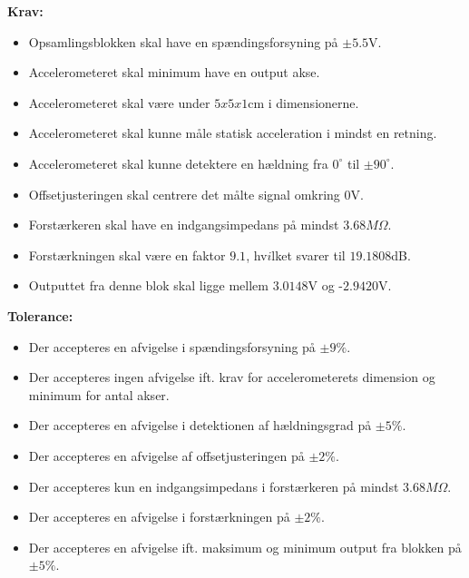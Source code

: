 \noindent\textbf{Krav:}
\begin{itemize}
	\item Opsamlingsblokken skal have en spændingsforsyning på $\pm5.5$V.
	\item Accelerometeret skal minimum have en output akse.%
	\item Accelerometeret skal være under $5x5x1$cm i dimensionerne.%
	\item Accelerometeret skal kunne måle statisk acceleration i mindst en retning.
	\item Accelerometeret skal kunne detektere en hældning fra $0^{\circ}$ til $\pm90^{\circ}$.
	\item Offsetjusteringen skal centrere det målte signal omkring $0$V.
	\item Forstærkeren skal have en indgangsimpedans på mindst $3.68M\Omega$.
	\item Forstærkningen skal være en faktor $9.1$, hv$i$lket svarer til $19.1808$dB.
	\item Outputtet fra denne blok skal ligge mellem $3.0148$V og -$2.9420$V.
\end{itemize}
\textbf{Tolerance:}
\begin{itemize}
	\item Der accepteres en afvigelse i spændingsforsyning på $\pm9\%$.
	\item Der accepteres ingen afvigelse ift. krav for accelerometerets dimension og minimum for antal akser.
	\item Der accepteres en afvigelse i detektionen af hældningsgrad på $\pm5\%$.
	\item Der accepteres en afvigelse af offsetjusteringen på $\pm2\%$.
	\item Der accepteres kun en indgangsimpedans i forstærkeren på mindst $3.68M\Omega$.
	\item Der accepteres en afvigelse i forstærkningen på $\pm2\%$.
	\item Der accepteres en afvigelse ift. maksimum og minimum output fra blokken på $\pm5\%$.
\end{itemize}
